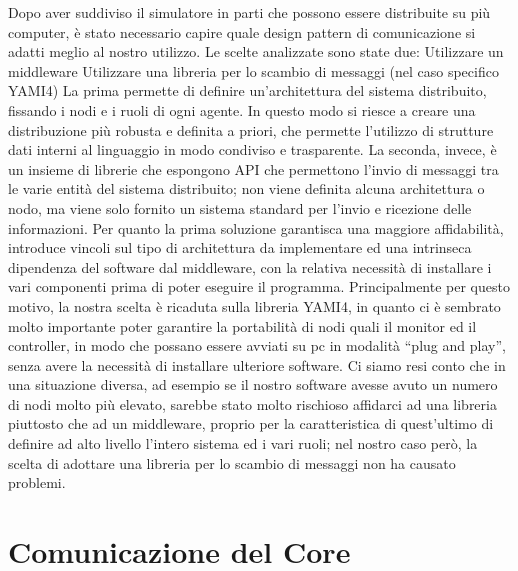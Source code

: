 Dopo aver suddiviso il simulatore in parti che possono essere distribuite su più computer, è stato necessario capire quale design pattern di comunicazione si adatti meglio al nostro utilizzo.
Le scelte analizzate sono state due:
Utilizzare un middleware
Utilizzare una libreria per lo scambio di messaggi (nel caso specifico YAMI4)
La prima permette di definire un’architettura del sistema distribuito, fissando i nodi e i ruoli di ogni agente. In questo modo si riesce a creare una distribuzione più robusta e definita a priori, che permette l’utilizzo di strutture dati interni al linguaggio in modo condiviso e trasparente.
La seconda, invece, è un insieme di librerie che espongono API che permettono l’invio di messaggi tra le varie entità del sistema distribuito; non viene definita alcuna architettura o nodo, ma viene solo fornito un sistema standard per l’invio e ricezione delle informazioni.
Per quanto la prima soluzione garantisca una maggiore affidabilità, introduce vincoli sul tipo di architettura da implementare ed una intrinseca dipendenza del software dal middleware, con la relativa necessità di installare i vari componenti prima di poter eseguire il programma.
Principalmente per questo motivo, la nostra scelta è ricaduta sulla libreria YAMI4, in quanto ci è sembrato molto importante poter garantire la portabilità di nodi quali il monitor ed il controller, in modo che possano essere avviati su pc in modalità “plug and play”, senza avere la necessità di installare ulteriore software.
Ci siamo resi conto che in una situazione diversa, ad esempio se il nostro software avesse avuto un numero di nodi molto più elevato, sarebbe stato molto rischioso affidarci ad una libreria piuttosto che ad un middleware, proprio per la caratteristica di quest’ultimo di definire ad alto livello l’intero sistema ed i vari ruoli; nel nostro caso però, la scelta di adottare una libreria per lo scambio di messaggi non ha causato problemi.


\section{Comunicazione del Core}

